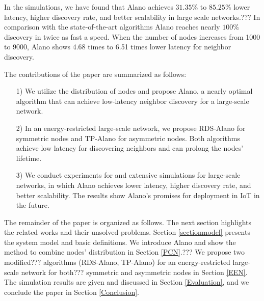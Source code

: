 In the simulations, we have found that Alano achieves $31.35\%$ to $ 85.25\%$
lower latency, higher discovery rate, and better scalability in large
scale networks.??? %
In comparison with the state-of-the-art algorithms \cite{you2011aloha, sun2014hello, chen2015heterogeneous, bakht2012searchlight}
Alano reaches nearly $100\%$ discovery in twice as fast a speed. 
When the number of nodes increases from 1000 to 9000, 
Alano shows 4.68 times to 6.51 times lower latency for neighbor discovery.

The contributions of the paper are summarized as follows:
\begin{itemize}
\item[1)] We utilize the distribution of nodes and propose Alano, a
nearly optimal algorithm that can achieve low-latency neighbor discovery
for a large-scale network.
\item[2)] In an energy-restricted large-scale network, we propose
RDS-Alano for symmetric nodes and TP-Alano for asymmetric nodes. Both
algorithms achieve low latency for discovering neighbors and can prolong
the nodes' lifetime.
\item[3)] We conduct experiments for %
and extensive simulations for large-scale networks, in which
Alano achieves lower latency, higher discovery rate, and better scalability.
The results show Alano's promises for deployment in
IoT in the future.
\end{itemize}

The remainder of the paper is organized as follows. The next section
highlights the related works and their unsolved problems.
Section \ref{sectionmodel} presents
the system model and basic definitions.
We introduce Alano and show the
method to combine nodes' distribution in Section \ref{PCN}.??? We propose
two modified??? algorithms (RDS-Alano, TP-Alano) for an energy-restricted
large-scale network for both??? symmetric and asymmetric nodes in Section
\ref{EEN}. The simulation results are given and discussed in Section
\ref{Evaluation}, and we conclude the paper in Section \ref{Conclusion}.
